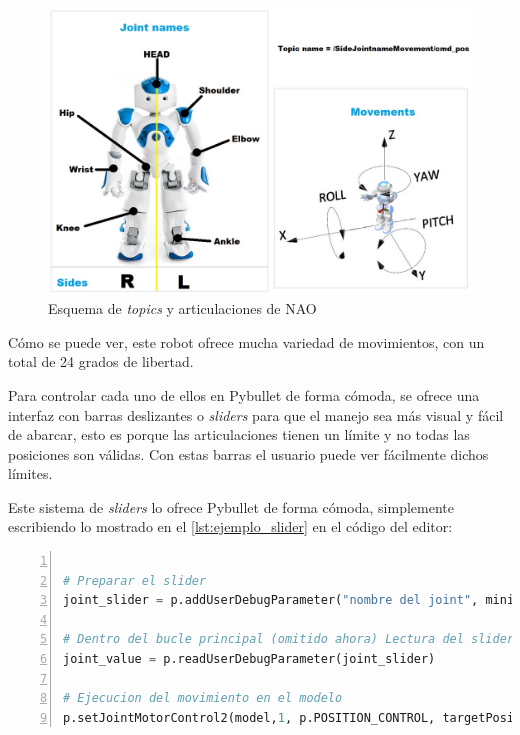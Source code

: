 \begin{figure}[H]
  \centering
  \includegraphics[width=1\textwidth]{figures/cap_4/esquema_joints_NAO.jpeg}
  \caption{Esquema de \textit{topics} y articulaciones de NAO}
  \label{fig:esquema_joints}
\end{figure}

Cómo se puede ver, este robot ofrece mucha variedad de movimientos, con un total de 24 grados de libertad.

Para controlar cada uno de ellos en Pybullet de forma cómoda, se ofrece una interfaz con barras deslizantes o \textit{sliders} para que el manejo sea más visual y fácil de abarcar, esto es porque las articulaciones tienen un límite y no todas las posiciones son válidas. Con estas barras el usuario puede ver fácilmente dichos límites.

Este sistema de \textit{sliders} lo ofrece Pybullet de forma cómoda, simplemente escribiendo lo mostrado en el \autoref{lst:ejemplo_slider} en el código del editor:

\begin{lstlisting}[language=Python, caption={Ejemplo de adicición de sliders al editor}, label={lst:ejemplo_slider}, numbers=left, 
backgroundcolor=\color{gray!10}]    

# Preparar el slider
joint_slider = p.addUserDebugParameter("nombre del joint", minimo, maximo, posicion inicial)

# Dentro del bucle principal (omitido ahora) Lectura del slider
joint_value = p.readUserDebugParameter(joint_slider)

# Ejecucion del movimiento en el modelo
p.setJointMotorControl2(model,1, p.POSITION_CONTROL, targetPosition=joint_value, maxVelocity=2)
\end{lstlisting}

